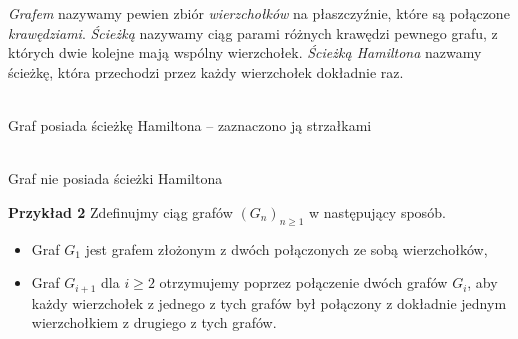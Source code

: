 \textit{Grafem} nazywamy pewien zbiór \textit{wierzchołków} na płaszczyźnie, które są połączone \textit{krawędziami}. \textit{Ścieżką} nazywamy ciąg parami różnych krawędzi pewnego grafu, z których dwie kolejne mają wspólny wierzchołek. \textit{Ścieżką Hamiltona} nazwamy ścieżkę, która przechodzi przez każdy wierzchołek dokładnie raz. 

\vspace{20px}

\begin{minipage}{0.5\textwidth}
\begin{center}
	\\
	Graf posiada ścieżkę Hamiltona -- zaznaczono ją strzałkami
\end{center}
\end{minipage}
\begin{minipage}{0.5\textwidth}
\begin{center}
	\\
	Graf nie posiada ścieżki Hamiltona
\end{center}
\end{minipage}


\vspace{20px}


\noindent
\textbf{Przykład 2}
	Zdefinujmy ciąg grafów $(G_n)_{n\geqslant1}$ w następujący sposób.
	\begin{itemize}
		\item Graf $G_1$ jest grafem złożonym z dwóch połączonych ze sobą wierzchołków,
		\item Graf $G_{i + 1}$ dla $i \geqslant 2$ otrzymujemy poprzez połączenie dwóch grafów $G_i$, aby każdy wierzchołek z jednego z tych grafów był połączony z dokładnie jednym wierzchołkiem z drugiego z tych grafów.
	\end{itemize}

